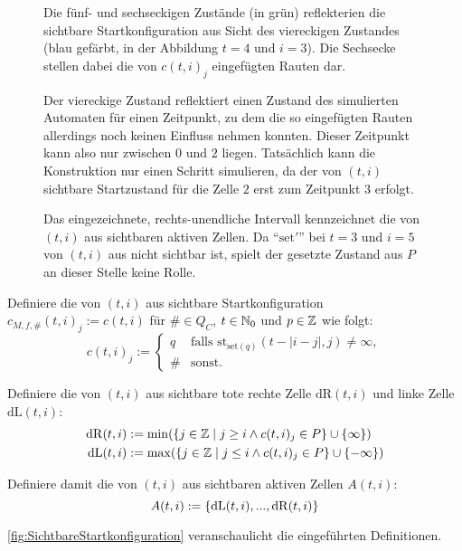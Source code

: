 \begin{definition}
\begin{figure}[h!]
        Die fünf- und sechseckigen Zustände (in grün) reflekterien die sichtbare Startkonfiguration aus
        Sicht des viereckigen Zustandes (blau gefärbt, in der Abbildung $t = 4$ und $i = 3$).
        Die Sechsecke stellen dabei die von $c(t,i)_j$ eingefügten Rauten dar.
        
        Der viereckige Zustand reflektiert einen Zustand des simulierten Automaten für einen Zeitpunkt,
        zu dem die so eingefügten Rauten allerdings noch keinen Einfluss nehmen konnten.
        Dieser Zeitpunkt kann also nur zwischen $0$ und $2$ liegen. Tatsächlich kann die Konstruktion
        nur einen Schritt simulieren, da der von $(t, i)$ sichtbare Startzustand für die Zelle $2$ erst zum Zeitpunkt $3$ erfolgt.
        
        Das eingezeichnete, rechts-unendliche Intervall kennzeichnet die von $(t, i)$ aus sichtbaren aktiven Zellen.
        Da \enquote{$\mathrm{set}'$} bei $t = 3$ und $i = 5$ von $(t, i)$ aus nicht sichtbar ist,
        spielt der gesetzte Zustand aus $P$ an dieser Stelle keine Rolle.
        
    \end{figure}
    
    Definiere die von $(t, i)$ aus sichtbare Startkonfiguration $c_{M, f, \#}(t, i)_j := c(t, i)$
    für $\# \in Q_C$, $t \in \mathbb{N}_0$ und $p \in \mathbb{Z}$ wie folgt:
    \[
        c(t, i)_j :=
        \begin{cases}
            q & 
                \text{falls } \mathrm{st}_{\mathrm{set}(q)}(t - |i-j|, j) \neq \infty,
             \\
            \# & \text{sonst.}
        \end{cases}
    \]
    
    Definiere die von $(t, i)$ aus sichtbare tote rechte Zelle $\mathrm{dR}(t, i)$ und linke Zelle $\mathrm{dL}(t, i)$:
    \begin{align*}
        \mathrm{dR}(t, i) & := \min (\{ { j \in \mathbb{Z}} \; | \; {j \geq i \land c(t, i)_j \in P} \} \cup \{ { \infty } \}) \\
        \mathrm{dL}(t, i) & := \max (\{ { j \in \mathbb{Z}} \; | \; {j \leq i \land c(t, i)_j \in P} \} \cup \{ { -\infty } \})
    \end{align*}
    
    Definiere damit die von $(t, i)$ aus sichtbaren aktiven Zellen $A(t, i)$:
    \[
        A(t, i) := \{ { \mathrm{dL}(t, i), ..., \mathrm{dR}(t, i)} \}
    \]
    
    \cref{fig:SichtbareStartkonfiguration} veranschaulicht die eingeführten Definitionen.
\end{definition}

